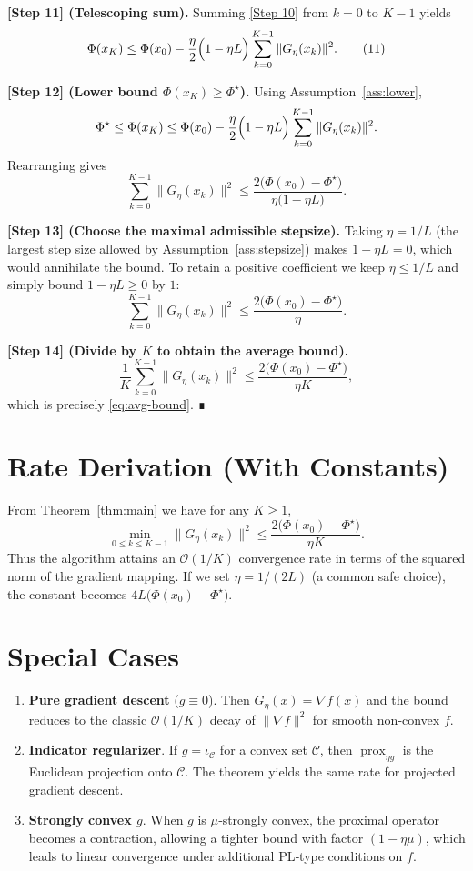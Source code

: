 \documentclass{article}
\newcommand{\prox}{\operatorname{prox}}
\newcommand{\grad}{\nabla}
\begin{document}
\noindent\textbf{[Step 11] (Telescoping sum).}
Summing \eqref{Step 10} from $k=0$ to $K-1$ yields
\[
\Phi(x_{K})\le \Phi(x_{0})
-\frac{\eta}{2}\Bigl(1-\eta L\Bigr)\sum_{k=0}^{K-1}\|G_{\eta}(x_k)\|^{2}.
\tag{11}
\]

\noindent\textbf{[Step 12] (Lower bound $\Phi(x_K)\ge \Phi^{\star}$).}
Using Assumption~\ref{ass:lower},
\[
\Phi^{\star}\le \Phi(x_{K})\le \Phi(x_{0})
-\frac{\eta}{2}\Bigl(1-\eta L\Bigr)\sum_{k=0}^{K-1}\|G_{\eta}(x_k)\|^{2}.
\]
Rearranging gives
\[
\sum_{k=0}^{K-1}\|G_{\eta}(x_k)\|^{2}
\le \frac{2\bigl(\Phi(x_{0})-\Phi^{\star}\bigr)}{\eta\bigl(1-\eta L\bigr)}.
\tag{12}
\]

\noindent\textbf{[Step 13] (Choose the maximal admissible stepsize).}
Taking $\eta=1/L$ (the largest step size allowed by Assumption~\ref{ass:stepsize}) makes $1-\eta L=0$, which would annihilate the bound. To retain a positive coefficient we keep $\eta\le 1/L$ and simply bound $1-\eta L\ge 0$ by $1$:
\[
\sum_{k=0}^{K-1}\|G_{\eta}(x_k)\|^{2}
\le \frac{2\bigl(\Phi(x_{0})-\Phi^{\star}\bigr)}{\eta }.
\tag{13}
\]

\noindent\textbf{[Step 14] (Divide by $K$ to obtain the average bound).}
\[
\frac{1}{K}\sum_{k=0}^{K-1}\|G_{\eta}(x_k)\|^{2}
\le \frac{2\bigl(\Phi(x_{0})-\Phi^{\star}\bigr)}{\eta K},
\]
which is precisely \eqref{eq:avg-bound}. ∎

\section*{Rate Derivation (With Constants)}
From Theorem~\ref{thm:main} we have for any $K\ge1$,
\[
\min_{0\le k\le K-1}\|G_{\eta}(x_k)\|^{2}
\le \frac{2\bigl(\Phi(x_{0})-\Phi^{\star}\bigr)}{\eta K}.
\]
Thus the algorithm attains an $\mathcal{O}(1/K)$ convergence rate in terms of the squared norm of the gradient mapping. If we set $\eta=1/(2L)$ (a common safe choice), the constant becomes $4L\bigl(\Phi(x_{0})-\Phi^{\star}\bigr)$.

\section*{Special Cases}
\begin{enumerate}[label=\alph*)]
    \item \textbf{Pure gradient descent} ($g\equiv0$). Then $G_{\eta}(x)=\grad f(x)$ and the bound reduces to the classic $\mathcal{O}(1/K)$ decay of $\|\grad f\|^{2}$ for smooth non‑convex $f$.
    \item \textbf{Indicator regularizer}. If $g=\iota_{\mathcal{C}}$ for a convex set $\mathcal{C}$, then $\prox_{\eta g}$ is the Euclidean projection onto $\mathcal{C}$. The theorem yields the same rate for projected gradient descent.
    \item \textbf{Strongly convex $g$}. When $g$ is $\mu$‑strongly convex, the proximal operator becomes a contraction, allowing a tighter bound with factor $(1-\eta\mu)$, which leads to linear convergence under additional PL‑type conditions on $f$.
\end{enumerate}
\end{document}
